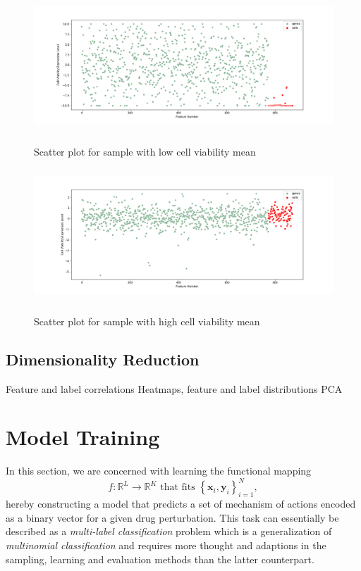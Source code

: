 \documentclass[bsc,frontabs,twoside,singlespacing,parskip,deptreport]{infthesis}     %
\begin{document}
\begin{figure}[h!]
\centering
\caption{Scatter plot for sample with low cell viability mean}
\includegraphics[height=5cm]{images/low_cell_mean.png}\label{low_mean}
\end{figure}
\begin{figure}[h!]
\centering
\caption{Scatter plot for sample with high cell viability mean}
\includegraphics[height=5cm]{images/high_cell_mean.png}\label{high_mean}
\end{figure}

\subsection{Dimensionality Reduction}

Feature and label correlations
Heatmaps, feature and label distributions
PCA
\clearpage
\section{Model Training}\label{moaprediction}
In this section, we are concerned with learning the functional mapping \[f: \mathbb{R}^{L} \rightarrow \mathbb{R}^{K} \text { that fits }\left\{\mathbf{x}_{i}, \mathbf{y}_{i}\right\}_{i=1}^{N},\] hereby constructing a model that predicts a set of mechanism of actions encoded as a binary vector for a given drug perturbation. 
This task can essentially be described as a \textit{multi-label classification} problem which is a generalization of \textit{multinomial classification} and requires more thought and adaptions in the sampling, learning and evaluation methods than the latter counterpart.\\
\end{document}
